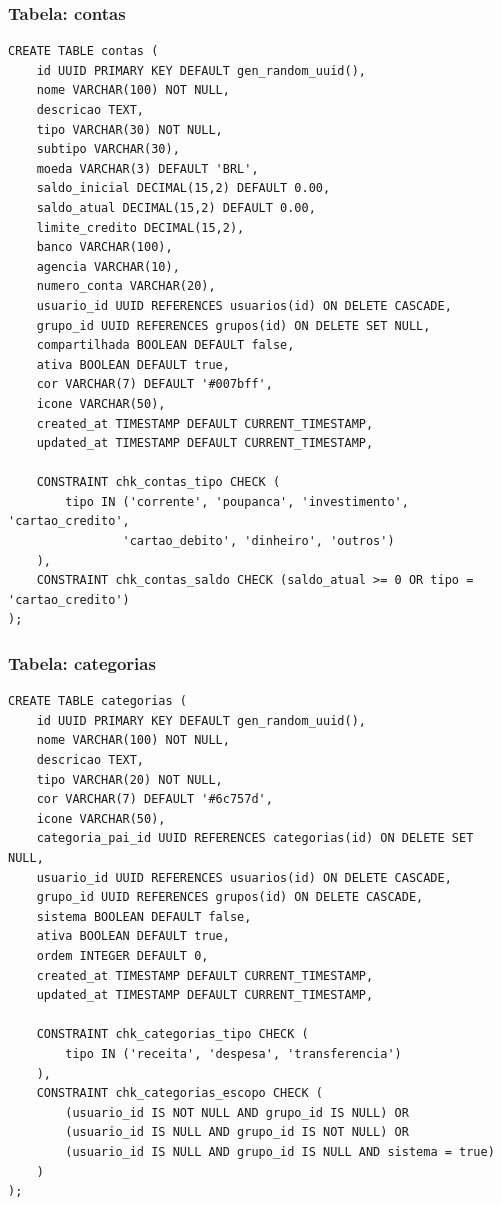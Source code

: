 \subsubsection{Tabela: contas}
\begin{lstlisting}[caption=Estrutura da tabela contas]
CREATE TABLE contas (
    id UUID PRIMARY KEY DEFAULT gen_random_uuid(),
    nome VARCHAR(100) NOT NULL,
    descricao TEXT,
    tipo VARCHAR(30) NOT NULL,
    subtipo VARCHAR(30),
    moeda VARCHAR(3) DEFAULT 'BRL',
    saldo_inicial DECIMAL(15,2) DEFAULT 0.00,
    saldo_atual DECIMAL(15,2) DEFAULT 0.00,
    limite_credito DECIMAL(15,2),
    banco VARCHAR(100),
    agencia VARCHAR(10),
    numero_conta VARCHAR(20),
    usuario_id UUID REFERENCES usuarios(id) ON DELETE CASCADE,
    grupo_id UUID REFERENCES grupos(id) ON DELETE SET NULL,
    compartilhada BOOLEAN DEFAULT false,
    ativa BOOLEAN DEFAULT true,
    cor VARCHAR(7) DEFAULT '#007bff',
    icone VARCHAR(50),
    created_at TIMESTAMP DEFAULT CURRENT_TIMESTAMP,
    updated_at TIMESTAMP DEFAULT CURRENT_TIMESTAMP,
    
    CONSTRAINT chk_contas_tipo CHECK (
        tipo IN ('corrente', 'poupanca', 'investimento', 'cartao_credito', 
                'cartao_debito', 'dinheiro', 'outros')
    ),
    CONSTRAINT chk_contas_saldo CHECK (saldo_atual >= 0 OR tipo = 'cartao_credito')
);
\end{lstlisting}

\subsubsection{Tabela: categorias}
\begin{lstlisting}[caption=Estrutura da tabela categorias]
CREATE TABLE categorias (
    id UUID PRIMARY KEY DEFAULT gen_random_uuid(),
    nome VARCHAR(100) NOT NULL,
    descricao TEXT,
    tipo VARCHAR(20) NOT NULL,
    cor VARCHAR(7) DEFAULT '#6c757d',
    icone VARCHAR(50),
    categoria_pai_id UUID REFERENCES categorias(id) ON DELETE SET NULL,
    usuario_id UUID REFERENCES usuarios(id) ON DELETE CASCADE,
    grupo_id UUID REFERENCES grupos(id) ON DELETE CASCADE,
    sistema BOOLEAN DEFAULT false,
    ativa BOOLEAN DEFAULT true,
    ordem INTEGER DEFAULT 0,
    created_at TIMESTAMP DEFAULT CURRENT_TIMESTAMP,
    updated_at TIMESTAMP DEFAULT CURRENT_TIMESTAMP,
    
    CONSTRAINT chk_categorias_tipo CHECK (
        tipo IN ('receita', 'despesa', 'transferencia')
    ),
    CONSTRAINT chk_categorias_escopo CHECK (
        (usuario_id IS NOT NULL AND grupo_id IS NULL) OR
        (usuario_id IS NULL AND grupo_id IS NOT NULL) OR
        (usuario_id IS NULL AND grupo_id IS NULL AND sistema = true)
    )
);
\end{lstlisting}

